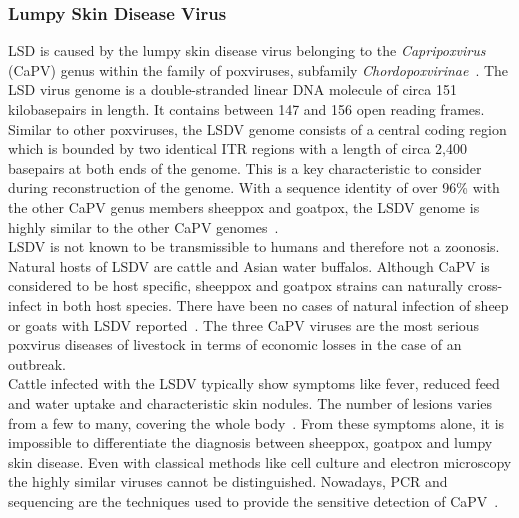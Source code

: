 \subsubsection*{Lumpy Skin Disease Virus}
\ac{LSD} is caused by the lumpy skin disease virus belonging to the \textit{Capripoxvirus} (CaPV) genus within the family of poxviruses, subfamily \textit{Chordopoxvirinae}~\cite{walker2019changes}. The \ac{LSD} virus genome is a double-stranded linear \ac{DNA} molecule of circa 151 kilobasepairs in length. It contains between 147 and 156 open reading frames. Similar to other poxviruses, the \ac{LSDV} genome consists of a central coding region which is bounded by two identical \ac{ITR} regions with a length of circa 2,400 basepairs at both ends of the genome. This is a key characteristic to consider during reconstruction of the genome. With a sequence identity of over 96\% with the other \acs{CaPV} genus members sheeppox and goatpox, the \ac{LSDV} genome is highly similar to the other \acs{CaPV} genomes~\cite{tulman2001genome}. \\
\ac{LSDV} is not known to be transmissible to humans and therefore not a zoonosis. Natural hosts of \ac{LSDV} are cattle and Asian water buffalos. Although \acs{CaPV} is considered to be host specific, sheeppox and goatpox strains can naturally cross-infect in both host species. There have been no cases of natural infection of sheep or goats with \ac{LSDV} reported~\cite{namazi2021lumpy}. The three \acs{CaPV} viruses are the most serious poxvirus diseases of livestock in terms of economic losses in the case of an outbreak. \\
Cattle infected with the \ac{LSDV} typically show symptoms like fever, reduced feed and water uptake and characteristic skin nodules. The number of lesions varies from a few to many, covering the whole body~\cite{prozesky1982study}. From these symptoms alone, it is impossible to differentiate the diagnosis between sheeppox, goatpox and lumpy skin disease. Even with classical methods like cell culture and electron microscopy the highly similar viruses cannot be distinguished. Nowadays, \ac{PCR} and sequencing are the techniques used to provide the sensitive detection of \acs{CaPV}~\cite{lafar2020capripoxvirus}.


